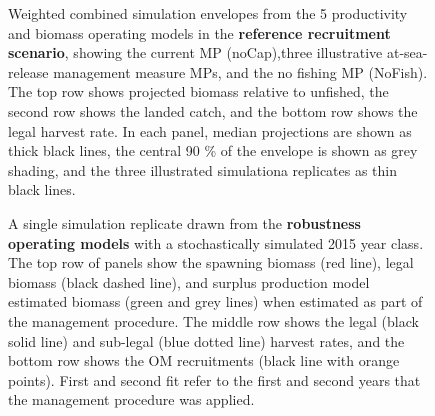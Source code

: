 \documentclass[11pt]{book}
\begin{document}
\begin{landscape}
\begin{figure}[htb]
{}

\caption{Weighted combined simulation envelopes from the 5 productivity and biomass operating models in the \textbf{reference recruitment scenario}, showing the current MP (noCap),three illustrative at-sea-release management measure MPs, and the no fishing MP (NoFish). The top row shows projected biomass relative to unfished, the second row shows the landed catch, and the bottom row shows the legal harvest rate. In each panel, median projections are shown as thick black lines, the central 90 \% of the envelope is shown as grey shading, and the three illustrated simulationa replicates as thin black lines.}\label{fig:unnamed-chunk-24}
\end{figure}
\newpage
\begin{figure}[htb]

{\centering {} 

}

\caption{A single simulation replicate drawn from the \textbf{robustness operating models} with a stochastically simulated 2015 year class. The top row of panels show the spawning biomass (red line), legal biomass (black dashed line), and surplus production model estimated biomass (green and grey lines) when estimated as part of the management procedure. The middle row shows the legal (black solid line) and sub-legal (blue dotted line) harvest rates, and the bottom row shows the OM recruitments (black line with orange points). First and second fit refer to the first and second years that the management procedure was applied.}\label{fig:unnamed-chunk-25}
\end{figure}
\newpage
\begin{figure}[htb]


\end{figure}
\end{landscape}
\end{document}
